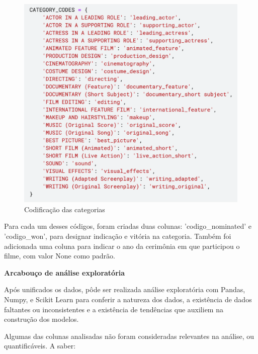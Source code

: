             \begin{figure}[htb]
            	\caption{\label{cat_cods}Codificação das categorias}
            	\begin{center}
            		\includegraphics[scale=0.7]{categ_codes.png}
            	\end{center}
            \end{figure}

            Para cada um desses códigos, foram criadas duas colunas: '{codigo}\_nominated' e '{codigo}\_won', para designar indicação e vitória na categoria. Também foi adicionada uma coluna para indicar o ano da cerimônia em que participou o filme, com valor None como padrão.\newline

            \textbf{Arcabouço de análise exploratória}\par
            Após unificados os dados, pôde ser realizada análise exploratória com Pandas, Numpy, e Scikit Learn para conferir a natureza dos dados, a existência de dados faltantes ou inconsistentes e a existência de tendências que auxiliem na construção dos modelos.\newline

            Algumas das colunas analisadas não foram consideradas relevantes na análise, ou quantificáveis. A saber:


